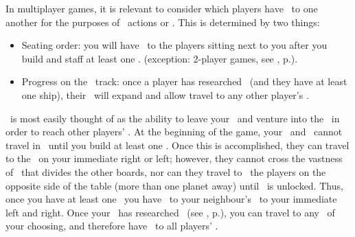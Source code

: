 In multiplayer games, it is relevant to consider which players have \reach\ to one another for the purposes of \military\ actions or \trade.  This is determined by two things:
\begin{itemize}
	\item Seating order: you will have \reach\ to the players sitting next to you after you build and staff at least one \starship. (exception: 2-player games, see , p.\pageref{sec:playercount}).
	\item Progress on the \tech\ track: once a player has researched \warpdrive\ (and they have at least one ship), their \reach\ will expand and allow travel to any other player's \planet.
\end{itemize}
\reach\ is most easily thought of as the ability to leave your \planet\ and venture into the \outerspace\ in order to reach other players' \planets.  At the beginning of the game, your \convoys\ and \squadrons\ cannot travel in \outerspace\ until you build at least one \starship.  Once this is accomplished, they can travel to the \planet\ on your immediate right or left; however, they cannot cross the vastness of \outerspace\ that divides the other boards, nor can they travel to \reach\ the players on the opposite side of the table (more than one planet away) until \warpdrive\ is unlocked.
\newline\newline
Thus, once you have at least one \starship\ you have \reach\ to your neighbour's \planet\ to your immediate left and right.  Once your \planet\ has researched \warpdrive\ (see , p.\pageref{sec:technology}), you can travel to any \planet\ of your choosing, and therefore have \reach\ to all players' \planets.
